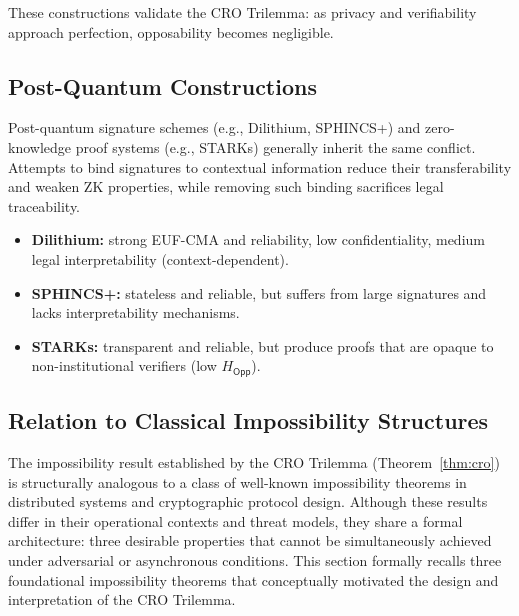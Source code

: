 \documentclass[preprint,12pt]{elsarticle}
\begin{document}
            These constructions validate the CRO Trilemma: as privacy and verifiability approach perfection, opposability becomes negligible.

        \subsection{Post-Quantum Constructions}\label{subsec:discussion_pq_construction}

            Post-quantum signature schemes (e.g., Dilithium, SPHINCS+) and zero-knowledge proof systems (e.g., STARKs) generally inherit the same conflict. Attempts to bind signatures to contextual information reduce their transferability and weaken ZK properties, while removing such binding sacrifices legal traceability.

            \begin{itemize}
                \item \textbf{Dilithium:} strong EUF-CMA and reliability, low confidentiality, medium legal interpretability (context-dependent).
                \item \textbf{SPHINCS+:} stateless and reliable, but suffers from large signatures and lacks interpretability mechanisms.
                \item \textbf{STARKs:} transparent and reliable, but produce proofs that are opaque to non-institutional verifiers (low $H_{\mathsf{Opp}}$).
            \end{itemize}
        \subsection{Relation to Classical Impossibility Structures}\label{subsec:discussion_impossibility}

            The impossibility result established by the CRO Trilemma (Theorem~\ref{thm:cro}) is structurally analogous to a class of well-known impossibility theorems in distributed systems and cryptographic protocol design. Although these results differ in their operational contexts and threat models, they share a formal architecture: three desirable properties that cannot be simultaneously achieved under adversarial or asynchronous conditions. This section formally recalls three foundational impossibility theorems that conceptually motivated the design and interpretation of the CRO Trilemma.
\end{document}
